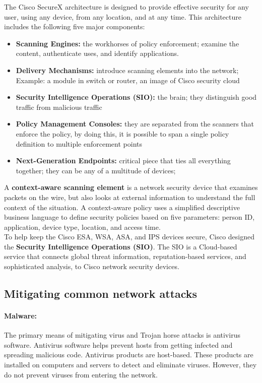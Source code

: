 The Cisco SecureX architecture is designed to provide effective security for any user, using any device, from any location, and at any time. This architecture includes the following five major components:

\begin{itemize}
\item \textbf{Scanning Engines:} the workhorses of policy enforcement; examine the content, authenticate uses, and identify applications.
\item \textbf{Delivery Mechanisms:} introduce scanning elements into the network; Example: a module in switch or router, an image of Cisco security cloud
\item \textbf{Security Intelligence Operations (SIO):} the brain; they distinguish good traffic from malicious traffic
\item \textbf{Policy Management Consoles:} they are separated from the scanners that enforce the policy, by doing this, it is possible to span a single policy definition to multiple enforcement points
\item \textbf{Next-Generation Endpoints:} critical piece that ties all everything together; they can be any of a multitude of devices; 
\end{itemize}

A \textbf{context-aware scanning element} is a network security device that examines packets on the wire, but also looks at external information to understand the full context of the situation. A context-aware policy uses a simplified descriptive business language to define security policies based on five parameters: person ID, application, device type, location, and access time.\\

To help keep the Cisco ESA, WSA, ASA, and IPS devices secure, Cisco designed the \textbf{Security Intelligence Operations (SIO)}. The SIO is a Cloud-based service that connects global threat information, reputation-based services, and sophisticated analysis, to Cisco network security devices.

\subsection{Mitigating common network attacks}

\paragraph{Malware:} The primary means of mitigating virus and Trojan horse attacks is antivirus software. Antivirus software helps prevent hosts from getting infected and spreading malicious code. Antivirus products are host-based. These products are installed on computers and servers to detect and eliminate viruses. However, they do not prevent viruses from entering the network.

